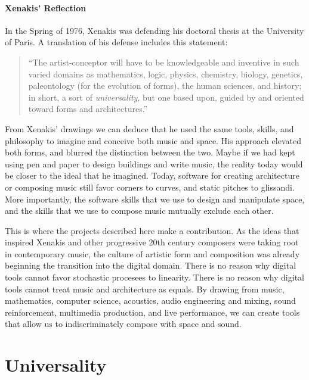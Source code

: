 \paragraph{Xenakis' Reflection} In the Spring of 1976, Xenakis was
defending his doctoral thesis at the University of Paris. A
translation of his defense includes this statement:
\begin{quotation}
  ``The artist-conceptor will have to be knowledgeable and inventive
  in such varied domains as mathematics, logic, physics, chemistry,
  biology, genetics, paleontology (for the evolution of forms), the
  human sciences, and history; in short, a sort of
  \emph{universality}, but one based upon, guided by and oriented
  toward forms and architectures.'' \cite{russolo1986art}
\end{quotation}
From Xenakis' drawings we can deduce that he used the same tools,
skills, and philosophy to imagine and conceive both music and
space. His approach elevated both forms, and blurred the distinction
between the two. Maybe if we had kept using pen and paper to design
buildings and write music, the reality today would be closer to the
ideal that he imagined. Today, software for creating architecture or
composing music still favor corners to curves, and static pitches to
glissandi. More importantly, the software skills that we use to design
and manipulate space, and the skills that we use to compose music
mutually exclude each other.

This is where the projects described here make a contribution. As the
ideas that inspired Xenakis and other progressive 20th century
composers were taking root in contemporary music, the culture of
artistic form and composition was already beginning the transition
into the digital domain. There is no reason why digital tools cannot
favor stochastic procesees to linearity. There is no reason why
digital tools cannot treat music and architecture as equals. By
drawing from music, mathematics, computer science, acoustics, audio
engineering and mixing, sound reinforcement, multimedia production,
and live performance, we can create tools that allow us to
indiscriminately compose with space and sound.

\section{Universality}
\label{sec:universality}

